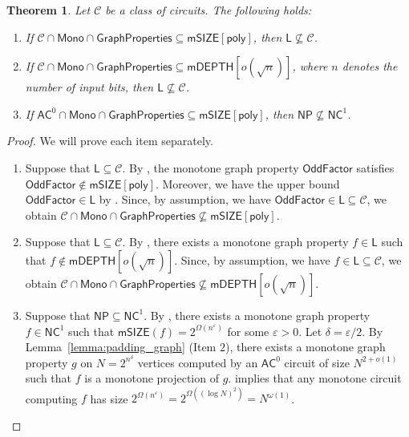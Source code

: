 \documentclass[10pt,a4paper]{article}
\newtheorem{theorem}{Theorem}[section]
\newcommand{\eps}{\varepsilon}
\newcommand{\poly}{\mathsf{poly}}
\newcommand{\complexityfont}[1]{\mathsf{#1}}
\newcommand{\monclass}[1]{\mathsf{m}#1}
\def\NP           {\complexityfont{NP}}
\def\AC           {\complexityfont{AC}}
\def\NC           {\complexityfont{NC}}
\def\SIZE         {\complexityfont{SIZE}}
\def\DEPTH        {\complexityfont{DEPTH}}
\def\mSIZE        {\monclass{\SIZE}}
\def\mDEPTH       {\monclass{\DEPTH}}
\renewcommand{\L} {\complexityfont{L}}
\newcommand{\semMon}[1]{#1 \cap \monfns}
\newcommand{\monfns}{\mathsf{Mono}}
\newcommand{\GraphPpts}{\mathsf{GraphProperties}}
\newcommand{\Cmon}[1]{\mathsf{mSIZE}({#1})}
\def\sseq{\subseteq}
\newcommand{\OddFactor}{\mathsf{OddFactor}}
\def\calc{{\mathcal C}}
\begin{document}
\begin{theorem}
    \label{cor:matching-ag}
    Let $\calc$ be 
    a class of circuits.
    The following holds:
    \begin{enumerate}
        \item 
            \label{item:gpsize}
            If $\semMon{\calc} \cap \GraphPpts \sseq \mSIZE[\poly]$,
            then 
            $\L
            \not\sseq
            \calc$.
        \item 
            \label{item:gpdepth}
            If 
            $\semMon{\calc} \cap \GraphPpts \sseq 
            \mDEPTH[o(\sqrt{n})]$, where $n$ denotes the number of input bits,
            then
            $\L
            \not\sseq
            \calc$.
        \item 
            \label{item:kclq}
            If 
            $\semMon{\AC^0} \cap \GraphPpts \subseteq \mSIZE[\poly]$,
            then $\NP \not\sseq \NC^1$.
    \end{enumerate}
\end{theorem}
\begin{proof}
    We will prove each item separately.

    \begin{enumerate}[label=\emph{Proof of (\arabic*)}., leftmargin=*]
        \item 
            Suppose that $\L \sseq \calc$.
            By ,
            the monotone graph property 
            $\OddFactor$
            satisfies
            $\OddFactor \notin \mSIZE[\poly]$.
            Moreover, we have the upper bound $\OddFactor \in \L$ by
            .
            Since, by assumption, we have $\OddFactor \in \L \sseq \calc$,
            we obtain
            $\semMon{\calc} \cap \GraphPpts \not\sseq \mSIZE[\poly]$.
        \item 
            Suppose that $\L \sseq \calc$.
            By 
            , 
            there exists a monotone graph property $f \in \L$ such
            that $f \notin \mDEPTH[o(\sqrt{n})]$.
            Since, by assumption, we have
            $f \in \L \sseq \calc$,
            we obtain
            $\semMon{\calc} \cap \GraphPpts \not\sseq \mDEPTH[o(\sqrt{n})]$.

        \item 
            Suppose that $\NP \sseq \NC^1$.
            By , there exists a monotone graph property
            $f \in \NC^1$ such that
            $\Cmon{f} = 2^{\Omega(n^\eps)}$ for some $\eps > 0$.
            Let $\delta = \eps/2$.
            By Lemma~\ref{lemma:padding_graph} (Item $2$),
            there exists a monotone graph property $g$ on
            $N = 2^{n^\delta}$ vertices
            computed by
            an $\AC^0$ circuit of size $N^{2+o(1)}$
            such that $f$ is a monotone projection of $g$.
            implies that 
            any monotone circuit computing $f$ has size
            $2^{\Omega(n^{\eps})} 
            = 2^{\Omega((\log N)^2)} = N^{\omega(1)}$.
            \qedhere
    \end{enumerate}
\end{proof}
\end{document}
